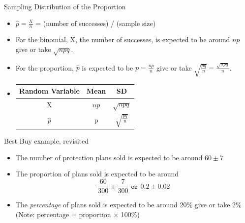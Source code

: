 \documentclass[14pt]{beamer}\usepackage[]{graphicx}\usepackage[]{color}
\begin{document}
\begin{frame}[fragile]{Sampling Distribution of the Proportion}

\begin{itemize}
\item<1-> $\hat{p} = \frac{X}{n}$ = (number of successes) / (sample size)

\item<2-> For the binomial, X, the number of successes, is expected to be around $np$ give or take $\sqrt{ n p q}$.

\item<3-> For the proportion, $\hat{p}$ is expected to be $p = \frac{n \hat{p}}{n}$ give or take $\sqrt{ \frac{p q}{n}} = \frac{ \sqrt{n p q}}{n}$. 

\item<4->
\begin{table}
\centering
\begin{tabular}{@{} ccc @{}} \hline
Random Variable & Mean & SD \\ \hline
X & $np$ & $\sqrt{n p q}$ \\
$\hat{p}$ & p & $\sqrt{ \frac{p q}{n}}$ \\ \hline
\end{tabular}
\end{table}
\end{itemize}
\end{frame}

\begin{frame}[fragile]{Best Buy example, revisited}

\begin{itemize}
\item<1-> The number of protection plans sold is expected to be around $60 \pm 7$

\item<2-> The proportion of plans sold is expected to be around
\begin{equation*}
  \frac{60}{300} \pm \frac{7}{300} \texttt{ or } 0.2 \pm 0.02
\end{equation*}

\item<3-> The \textit{percentage} of plans sold is expected to be around 20\%  give or take 2\% (Note: percentage = proportion $\times$ 100\%)
\end{itemize}
\end{frame}
\end{document}
